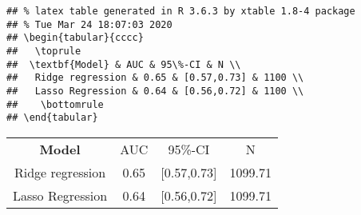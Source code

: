 \documentclass[
]{article}
\begin{document}
\begin{verbatim}
## % latex table generated in R 3.6.3 by xtable 1.8-4 package
## % Tue Mar 24 18:07:03 2020
## \begin{tabular}{cccc}
##   \toprule
##  \textbf{Model} & AUC & 95\%-CI & N \\ 
##   Ridge regression & 0.65 & [0.57,0.73] & 1100 \\ 
##   Lasso Regression & 0.64 & [0.56,0.72] & 1100 \\ 
##    \bottomrule
## \end{tabular}
\end{verbatim}

\begin{tabular}{cccc}
  \toprule
 \textbf{Model} & AUC & 95\%-CI & N \\ 
  Ridge regression & 0.65 & [0.57,0.73] & 1099.71 \\ 
  Lasso Regression & 0.64 & [0.56,0.72] & 1099.71 \\ 
   \bottomrule
\end{tabular}
\end{document}
